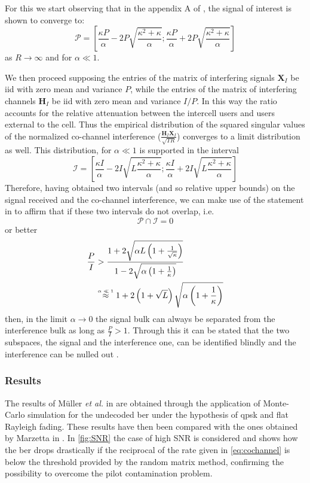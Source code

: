 \documentclass[11pt]{book}
\newcommand{\myeq}{\mathrel{\stackrel{\mbox{\normalfont\tiny{$\alpha \ll 1$}}}{\approx}}}
\begin{document}
For this we start observing that in the appendix A of \cite{Ralf}, the signal of interest is shown to converge to:
\begin{equation}
  \mathcal{P} = \left[\frac{\kappa P}{\alpha}-2P\sqrt{\frac{\kappa^2 + \kappa}{\alpha}};\frac{\kappa P}{\alpha} + 2P\sqrt{\frac{\kappa^2 + \kappa}{\alpha}}\right]
\end{equation}
as $R \rightarrow \infty$ and for $\alpha \ll 1$.

We then proceed supposing the entries of the matrix of interfering signals $\mathbf{X}_I$ be iid with zero mean and variance $P$, while the entries of the matrix of interfering channels $\mathbf{H}_I$ be iid with zero mean and variance $I/P$. In this way the ratio accounts for the relative attenuation between the intercell users and users external to the cell. Thus the empirical distribution of the squared singular values of the normalized co-channel interference ($\frac{\mathbf{H}_I\mathbf{X}_I}{\sqrt{TR}}$) converges to a limit distribution as well. This distribution, for $\alpha \ll 1$ is supported in the interval
\begin{equation}
  \mathcal{I} =  \left[\frac{\kappa I}{\alpha}-2I\sqrt{L\frac{\kappa^2 + \kappa}{\alpha}};\frac{\kappa I}{\alpha} + 2I\sqrt{L\frac{\kappa^2 + \kappa}{\alpha}}\right]
\end{equation}
Therefore, having obtained two intervals (and so relative upper bounds) on the signal received and the co-channel interference, we can make use of the statement in \cite{Ralf2012} to affirm that if these two intervals do not overlap, i.e.
\begin{equation}
  \mathcal{P}\cap \mathcal{I} = 0
\end{equation}
or better
\begin{align}
  \label{eq:cochannel}
  \frac{P}{I} &> \frac{1 + 2\sqrt{\alpha L \left( 1 + \frac{1}{\sqrt{\kappa}} \right)}}{1 - 2 \sqrt{\alpha \left( 1 + \frac{1}{\kappa} \right)}}\\ \nonumber
  &\myeq 1 + 2 \left( 1 + \sqrt{L} \right)\sqrt{\alpha \left( 1 + \frac{1}{\kappa} \right)}
\end{align}
then, in the limit $\alpha \rightarrow 0$ the signal bulk can always be separated from the interference bulk as long as $\frac{P}{I} > 1$. Through this it can be stated that the two subspaces, the signal and the interference one, can be identified blindly and the interference can be nulled out \cite{Ralf}.

\subsubsection{Results}
The results of M\"uller \textit{et al.} in \cite{Ralf} are obtained through the application of Monte-Carlo simulation for the undecoded \gls{ber} under the hypothesis of \gls{qpsk} and flat Rayleigh fading. These results have then been compared with the ones obtained by Marzetta in \cite{Marzetta2010}. In \autoref{fig:SNR} the case of high SNR is considered and shows how the \gls{ber} drops drastically if the reciprocal of the rate given in \ref{eq:cochannel} is below the threshold provided by the random matrix method, confirming the possibility to overcome the pilot contamination problem.
\end{document}
